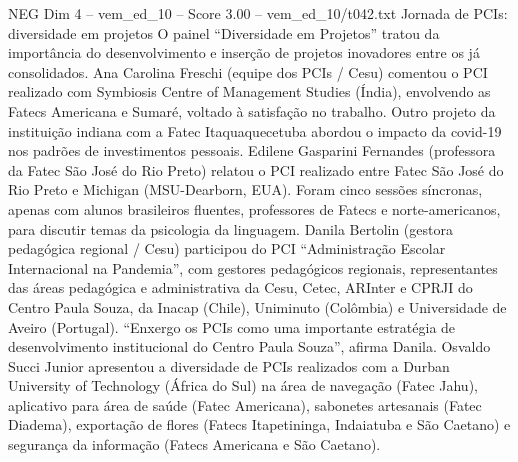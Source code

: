 \begin{textsample}{NEG Dim 4 – vem\_ed\_10 – Score 3.00 – vem\_ed\_10/t042.txt}  \label{ex:f4_neg_036}
Jornada de PCIs: diversidade em projetos O painel “Diversidade em Projetos” tratou da importância do desenvolvimento e inserção de projetos inovadores entre os já consolidados.
Ana Carolina Freschi (equipe dos PCIs / Cesu) comentou o PCI realizado com Symbiosis Centre of Management Studies (Índia), envolvendo as Fatecs Americana e Sumaré, voltado à satisfação no trabalho.
Outro projeto da instituição indiana com a Fatec Itaquaquecetuba abordou o impacto da covid-19 nos padrões de investimentos pessoais.
Edilene Gasparini Fernandes (professora da Fatec São José do Rio Preto) relatou o PCI realizado entre Fatec São José do Rio Preto e Michigan (MSU-Dearborn, EUA).
Foram cinco sessões síncronas, apenas com alunos brasileiros fluentes, professores de Fatecs e norte-americanos, para discutir temas da psicologia da linguagem.
Danila Bertolin (gestora pedagógica regional / Cesu) participou do PCI “Administração Escolar Internacional na Pandemia”, com gestores pedagógicos regionais, representantes das áreas pedagógica e administrativa da Cesu, Cetec, ARInter e CPRJI do Centro Paula Souza, da Inacap (Chile), Uniminuto (Colômbia) e Universidade de Aveiro (Portugal). “Enxergo os PCIs como uma importante estratégia de desenvolvimento institucional do Centro Paula Souza”, afirma Danila.
Osvaldo Succi Junior apresentou a diversidade de PCIs realizados com a Durban University of Technology (África do Sul) na área de navegação (Fatec Jahu), aplicativo para área de saúde (Fatec Americana), sabonetes artesanais (Fatec Diadema), exportação de flores (Fatecs Itapetininga, Indaiatuba e São Caetano) e segurança da informação (Fatecs Americana e São Caetano).

\end{textsample}
